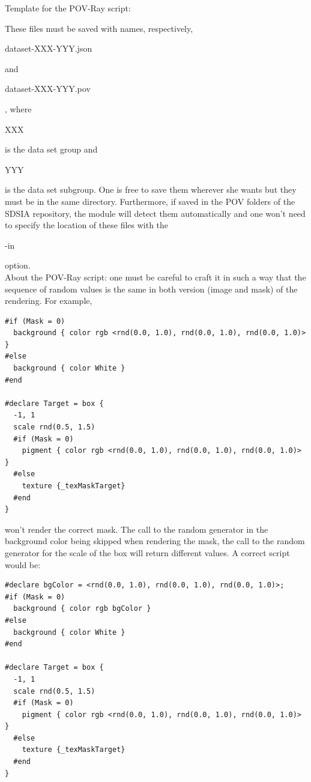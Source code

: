Template for the POV-Ray script:\\
\begin{scriptsize}
\begin{ttfamily}

\end{ttfamily}
\end{scriptsize}

These files must be saved with names, respectively, \begin{ttfamily}dataset-XXX-YYY.json\end{ttfamily} and \begin{ttfamily}dataset-XXX-YYY.pov\end{ttfamily}, where \begin{ttfamily}XXX\end{ttfamily} is the data set group and \begin{ttfamily}YYY\end{ttfamily} is the data set subgroup. One is free to save them wherever she wants but they must be in the same directory. Furthermore, if saved in the POV folders of the SDSIA repository, the module will detect them automatically and one won't need to specify the location of these files with the \begin{ttfamily}-in\end{ttfamily} option.\\

About the POV-Ray script: one must be careful to craft it in such a way that the sequence of random values is the same in both version (image and mask) of the rendering. For example,
\begin{scriptsize}
\begin{ttfamily}
\begin{verbatim}
#if (Mask = 0)
  background { color rgb <rnd(0.0, 1.0), rnd(0.0, 1.0), rnd(0.0, 1.0)> }
#else
  background { color White }
#end

#declare Target = box {
  -1, 1
  scale rnd(0.5, 1.5)
  #if (Mask = 0)
    pigment { color rgb <rnd(0.0, 1.0), rnd(0.0, 1.0), rnd(0.0, 1.0)> }
  #else
    texture {_texMaskTarget}
  #end
}
\end{verbatim}
\end{ttfamily}
\end{scriptsize}
won't render the correct mask. The call to the random generator in the background color being skipped when rendering the mask, the call to the random generator for the scale of the box will return different values. A correct script would be:
\begin{scriptsize}
\begin{ttfamily}
\begin{verbatim}
#declare bgColor = <rnd(0.0, 1.0), rnd(0.0, 1.0), rnd(0.0, 1.0)>;
#if (Mask = 0)
  background { color rgb bgColor }
#else
  background { color White }
#end

#declare Target = box {
  -1, 1
  scale rnd(0.5, 1.5)
  #if (Mask = 0)
    pigment { color rgb <rnd(0.0, 1.0), rnd(0.0, 1.0), rnd(0.0, 1.0)> }
  #else
    texture {_texMaskTarget}
  #end
}
\end{verbatim}
\end{ttfamily}
\end{scriptsize}


